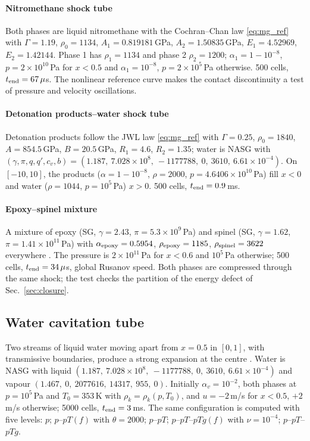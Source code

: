 \documentclass[a4paper,fleqn]{cas-sc}
\begin{document}
\paragraph{Nitromethane shock tube}
Both phases are liquid nitromethane with the Cochran--Chan law \eqref{eq:mg_ref} \cite[Sec.~4.2]{SPB2009}
with $\Gamma=1.19$, $\rho_0=1134$, $A_1=0.819181$\,GPa, $A_2=1.50835$\,GPa, $E_1=4.52969$, $E_2=1.42144$. Phase 1 has
$\rho_1=1134$ and phase 2 $\rho_2=1200$; $\alpha_1=1-10^{-8}$, $p=2\times10^{10}$\,Pa for $x<0.5$ and $\alpha_1=10^{-8}$,
$p=2\times10^5$\,Pa otherwise. 500 cells, $t_{\rm end}=67\,\mu$s. The nonlinear reference curve makes the contact
discontinuity a test of pressure and velocity oscillations.

\paragraph{Detonation products--water shock tube}
Detonation products follow the JWL law \eqref{eq:mg_ref} \cite[Sec.~8.1.1]{Pelanti2022}
with $\Gamma=0.25$, $\rho_0=1840$, $A=854.5$\,GPa, $B=20.5$\,GPa, $R_1=4.6$, $R_2=1.35$; water is NASG with $(\gamma,\pi,q,q',c_v,b)=
(1.187,\ 7.028\times10^8,\ -1177788,\ 0,\ 3610,\ 6.61\times10^{-4})$. On $[-10,10]$, the products ($\alpha=1-10^{-8}$, $\rho=2000$,
$p=4.6406\times10^{10}$\,Pa) fill $x<0$ and water ($\rho=1044$, $p=10^5$\,Pa) $x>0$. 500 cells, $t_{\rm end}=0.9$\,ms.

\paragraph{Epoxy--spinel mixture}
A mixture of epoxy (SG, $\gamma=2.43$, $\pi=5.3\times10^9$\,Pa) and spinel (SG, $\gamma=1.62$, $\pi=1.41\times10^{11}$\,Pa) with
$\alpha_{\rm epoxy}=0.5954$, $\rho_{\rm epoxy}=1185$, $\rho_{\rm spinel}=3622$ everywhere \cite[Sec.~5.2]{SPB2009}. The pressure
is $2\times10^{11}$\,Pa for $x<0.6$ and $10^5$\,Pa otherwise; 500 cells, $t_{\rm end}=34\,\mu$s, global Rusanov speed. Both phases
are compressed through the same shock; the test checks the partition of the energy defect of Sec.~\ref{sec:closure}.

\subsection{Water cavitation tube}
\label{sec:res_cav}
Two streams of liquid water moving apart from $x=0.5$ in $[0,1]$, with transmissive boundaries, produce a strong
expansion at the centre \cite[Sec.~8.2.1]{Pelanti2022}. Water is NASG with liquid $(1.187,\ 7.028\times10^8,\ -1177788,\ 0,\ 3610,\ 6.61\times10^{-4})$
and vapour $(1.467,\ 0,\ 2077616,\ 14317,\ 955,\ 0)$. Initially $\alpha_v=10^{-2}$, both phases at $p=10^5$\,Pa and $T_0=353$\,K with
$\rho_k=\rho_k(p,T_0)$, and $u=-2$\,m/s for $x<0.5$, $+2$\,m/s otherwise; 5000 cells, $t_{\rm end}=3$\,ms. The same configuration
is computed with five levels: $p$; $p$--$pT(f)$ with $\theta=2000$; $p$--$pT$; $p$--$pT$--$pTg(f)$ with $\nu=10^{-4}$; $p$--$pT$--$pTg$.
\end{document}
